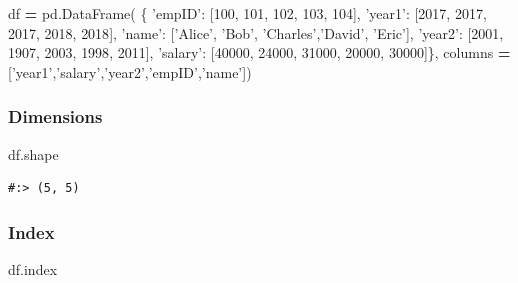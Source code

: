 \documentclass[
]{book}
\newenvironment{Shaded}{\begin{snugshade}}{\end{snugshade}}
\newcommand{\DecValTok}[1]{\textcolor[rgb]{0.06,0.06,0.06}{#1}}
\newcommand{\NormalTok}[1]{#1}
\newcommand{\OperatorTok}[1]{\textcolor[rgb]{0.43,0.43,0.43}{\textbf{#1}}}
\newcommand{\StringTok}[1]{\textcolor[rgb]{0.5,0.5,0.5}{#1}}
\begin{document}
\begin{Shaded}
\begin{Highlighting}[]
\NormalTok{df }\OperatorTok{=}\NormalTok{ pd.DataFrame(}
\NormalTok{    \{ }\StringTok{'empID'}\NormalTok{:  [}\DecValTok{100}\NormalTok{,      }\DecValTok{101}\NormalTok{,    }\DecValTok{102}\NormalTok{,      }\DecValTok{103}\NormalTok{,     }\DecValTok{104}\NormalTok{],}
      \StringTok{'year1'}\NormalTok{:   [}\DecValTok{2017}\NormalTok{,     }\DecValTok{2017}\NormalTok{,   }\DecValTok{2017}\NormalTok{,      }\DecValTok{2018}\NormalTok{,    }\DecValTok{2018}\NormalTok{],}
      \StringTok{'name'}\NormalTok{:   [}\StringTok{'Alice'}\NormalTok{,  }\StringTok{'Bob'}\NormalTok{,  }\StringTok{'Charles'}\NormalTok{,}\StringTok{'David'}\NormalTok{, }\StringTok{'Eric'}\NormalTok{],}
      \StringTok{'year2'}\NormalTok{:   [}\DecValTok{2001}\NormalTok{,     }\DecValTok{1907}\NormalTok{,   }\DecValTok{2003}\NormalTok{,      }\DecValTok{1998}\NormalTok{,    }\DecValTok{2011}\NormalTok{],}
      \StringTok{'salary'}\NormalTok{: [}\DecValTok{40000}\NormalTok{,    }\DecValTok{24000}\NormalTok{,  }\DecValTok{31000}\NormalTok{,     }\DecValTok{20000}\NormalTok{,   }\DecValTok{30000}\NormalTok{]\},}
\NormalTok{    columns }\OperatorTok{=}\NormalTok{ [}\StringTok{'year1'}\NormalTok{,}\StringTok{'salary'}\NormalTok{,}\StringTok{'year2'}\NormalTok{,}\StringTok{'empID'}\NormalTok{,}\StringTok{'name'}\NormalTok{])}
\end{Highlighting}
\end{Shaded}

\hypertarget{dimensions-1}{%
\subsubsection{Dimensions}\label{dimensions-1}}

\begin{Shaded}
\begin{Highlighting}[]
\NormalTok{df.shape}
\end{Highlighting}
\end{Shaded}

\begin{verbatim}
#:> (5, 5)
\end{verbatim}

\hypertarget{index}{%
\subsubsection{Index}\label{index}}

\begin{Shaded}
\begin{Highlighting}[]
\NormalTok{df.index}
\end{Highlighting}
\end{Shaded}
\end{document}
